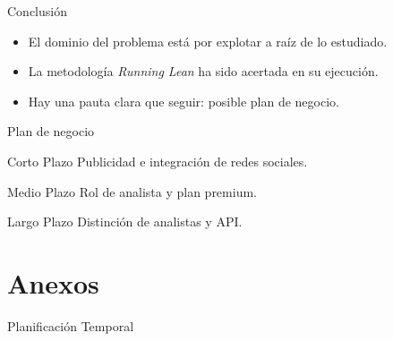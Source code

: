 \documentclass[12pt]{beamer}
\begin{document}
		\begin{frame}{Conclusión}
			\begin{itemize}
				\item El dominio del problema está por explotar a raíz de lo estudiado.
				\item La metodología \textit{Running Lean} ha sido acertada en su ejecución.
				\item Hay una pauta clara que seguir: posible plan de negocio.
			\end{itemize}
		\end{frame}
		
		\begin{frame}{Plan de negocio}
			\begin{block}{Corto Plazo}
				Publicidad e integración de redes sociales.
			\end{block}
			\begin{block}{Medio Plazo}
				Rol de analista y plan premium.
			\end{block}
			\begin{block}{Largo Plazo}
				Distinción de analistas y API.
			\end{block}
		\end{frame}
	
	\section{Anexos}
        \begin{frame}{Planificación Temporal}
        \end{frame}
\end{document}
